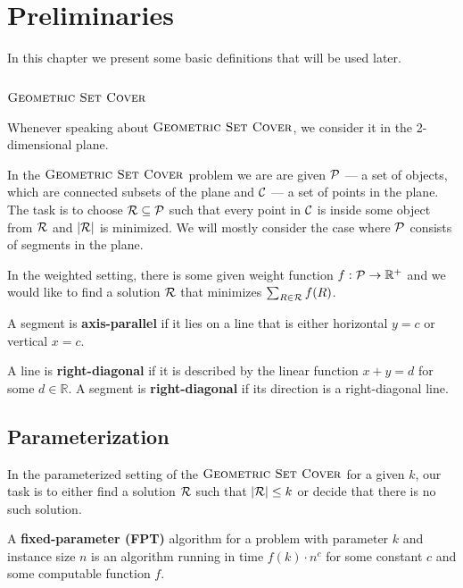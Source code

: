 \chapter{Preliminaries}

In this chapter we present some basic definitions that
will be used later.

\section{$\textsc{Geometric Set Cover}$}
\label{section:def:geometric__set_cover}
Whenever speaking about $\textsc{Geometric Set Cover}$,
we consider it in the 2-dimensional plane.

In the $\textsc{Geometric Set Cover}$ problem we are are given
$\mathcal{P}$ --- a set of objects, which are connected
subsets of the plane and $\mathcal{C}$ --- a set of points in the plane.
The task is to choose $\mathcal{R} \subseteq \mathcal{P}$ such that
every point in $\mathcal{C}$ is inside some object from $\mathcal{R}$
and $|\mathcal{R}|$ is minimized. We will mostly consider the case where
$\mathcal{P}$ consists of segments in the plane.

In the weighted setting, there is some given weight function
$f : \mathcal{P} \rightarrow \mathbb{R^+}$
and we would like to find a solution $\mathcal{R}$
that minimizes $\sum_{R \in \mathcal{R}} f(R)$.

\begin{defi}
A segment is \textbf{axis-parallel} if it lies on a line that is
either horizontal $y = c$ or vertical $x = c$.
\end{defi}

\begin{defi}
	A line is \textbf{right-diagonal} if it is
	described by the linear function $x + y = d$ for some $d \in \mathbb{R}$.
	A segment is \textbf{right-diagonal} if its
	direction is a right-diagonal line.
\end{defi}

\section{Parameterization}

In the parameterized setting of the $\textsc{Geometric Set Cover}$
for a given $k$,
our task is to either find a solution $\mathcal{R}$ such that $|\mathcal{R}| \le k$
or decide that there is no such solution.

\begin{defi}
A \textbf{fixed-parameter (FPT)} algorithm 
for a problem with parameter $k$ and instance size $n$
is an algorithm running in time $f(k) \cdot n^c$
for some constant $c$ and some computable function $f$.
\end{defi}

